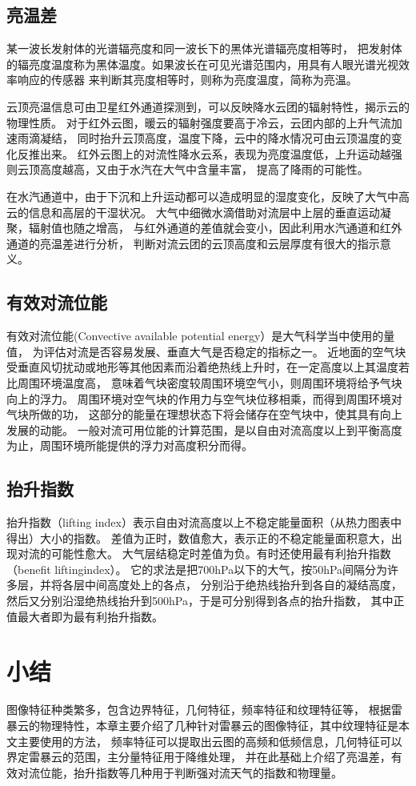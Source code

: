\subsection{亮温差}
某一波长发射体的光谱辐亮度和同一波长下的黑体光谱辐亮度相等时，
把发射体的辐亮度温度称为黑体温度。如果波长在可见光谱范围内，用具有人眼光谱光视效率响应的传感器
来判断其亮度相等时，则称为亮度温度，简称为亮温。

云顶亮温信息可由卫星红外通道探测到，可以反映降水云团的辐射特性，揭示云的物理性质。 
对于红外云图，暖云的辐射强度要高于冷云，云团内部的上升气流加速雨滴凝结，
同时抬升云顶高度，温度下降，云中的降水情况可由云顶温度的变化反推出来。 
红外云图上的对流性降水云系，表现为亮度温度低，上升运动越强则云顶高度越高，又由于水汽在大气中含量丰富，
提高了降雨的可能性\cite{liangwencha}。

在水汽通道中，由于下沉和上升运动都可以造成明显的湿度变化，反映了大气中高云的信息和高层的干湿状况。
大气中细微水滴借助对流层中上层的垂直运动凝聚，辐射值也随之增高，
与红外通道的差值就会变小，因此利用水汽通道和红外通道的亮温差进行分析，
判断对流云团的云顶高度和云层厚度有很大的指示意义\cite{FY2D}。

\iffalse
在红外$10.7\sim12.0μm$波段之间，由于红外一通道的下降趋势相比红外二通道要明显，
故通道之间的差值可以用来描述强对流发生过程中的发展状态。对于积状云边缘的卷云结构，虽然云顶亮温很低，
但云的光学厚度较小，不足以遮挡云底的向上辐射，造成两个通道上的亮度温度值相比较$CH1> CH2$，
半透明云区或部分有云区存在亮温差值较大，而在对流发展较强的区域，云层越厚，云顶亮温越低，
两通道的亮温差偏小，说明红外一通道与二通道亮温差提供了一定的降水信息。
\fi

\subsection{有效对流位能}
有效对流位能(Convective available potential energy）是大气科学当中使用的量值，
为评估对流是否容易发展、垂直大气是否稳定的指标之一。
近地面的空气块受垂直风切扰动或地形等其他因素而沿着绝热线上升时，在一定高度以上其温度若比周围环境温度高，
意味着气块密度较周围环境空气小，则周围环境将给予气块向上的浮力。
周围环境对空气块的作用力与空气块位移相乘，而得到周围环境对气块所做的功，
这部分的能量在理想状态下将会储存在空气块中，使其具有向上发展的动能。
一般对流可用位能的计算范围，是以自由对流高度以上到平衡高度为止，周围环境所能提供的浮力对高度积分而得。


\subsection{抬升指数}
抬升指数（lifting index）表示自由对流高度以上不稳定能量面积（从热力图表中得出）大小的指数。
差值为正时，数值愈大，表示正的不稳定能量面积意大，出现对流的可能性愈大。
大气层结稳定时差值为负。有时还使用最有利抬升指数（benefit liftingindex）。
它的求法是把700hPa以下的大气，按50hPa间隔分为许多层，并将各层中间高度处上的各点，
分别沿于绝热线抬升到各自的凝结高度，然后又分别沿湿绝热线抬升到500hPa，于是可分别得到各点的抬升指数，
其中正值最大者即为最有利抬升指数\cite{duochidu}\cite{duochidu_eng}。


\section{小结}
图像特征种类繁多，包含边界特征，几何特征，频率特征和纹理特征等，
根据雷暴云的物理特性，本章主要介绍了几种针对雷暴云的图像特征，其中纹理特征是本文主要使用的方法，
频率特征可以提取出云图的高频和低频信息，几何特征可以界定雷暴云的范围，主分量特征用于降维处理，
并在此基础上介绍了亮温差，有效对流位能，抬升指数等几种用于判断强对流天气的指数和物理量。
